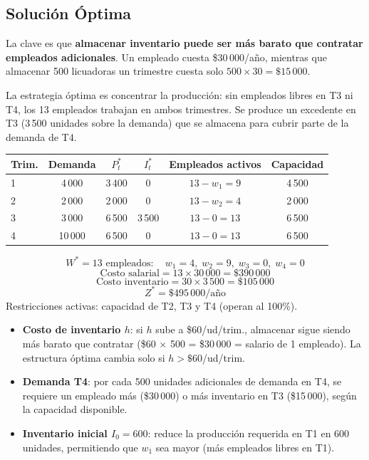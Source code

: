 \documentclass[12pt,a4paper]{article}
\begin{document}
\subsection{Solución Óptima}

La clave es que \textbf{almacenar inventario puede ser más barato que contratar
empleados adicionales}. Un empleado cuesta \$30\,000/año, mientras que almacenar
500 licuadoras un trimestre cuesta solo $500 \times 30 = \$15\,000$.

La estrategia óptima es concentrar la producción: sin empleados libres en T3 ni T4,
los 13 empleados trabajan en ambos trimestres.  Se produce un excedente en T3
(3\,500 unidades sobre la demanda) que se almacena para cubrir parte de la demanda
de T4.

\begin{center}
\renewcommand{\arraystretch}{1.3}
\begin{tabular}{@{}lccccc@{}}
\toprule
\textbf{Trim.} & \textbf{Demanda} & $P_t^*$ & $I_t^*$ &
  \textbf{Empleados activos} & \textbf{Capacidad}\\
\midrule
1 &  4\,000 & 3\,400 &     0 & $13 - w_1 = 9$  & 4\,500\\
2 &  2\,000 & 2\,000 &     0 & $13 - w_2 = 4$  & 2\,000\\
3 &  3\,000 & 6\,500 & 3\,500 & $13 - 0 = 13$   & 6\,500\\
4 & 10\,000 & 6\,500 &     0 & $13 - 0 = 13$   & 6\,500\\
\bottomrule
\end{tabular}
\end{center}

\begin{solucbox}
\[
  W^* = 13\text{ empleados}:\quad w_1=4,\;w_2=9,\;w_3=0,\;w_4=0
\]
\[
  \text{Costo salarial} = 13 \times 30\,000 = \$390\,000
\]
\[
  \text{Costo inventario} = 30 \times 3\,500 = \$105\,000
\]
\[
  \boxed{Z^* = \$495\,000/\text{año}}
\]
Restricciones activas: capacidad de T2, T3 y T4 (operan al 100\%).
\end{solucbox}

\begin{sensbox}
\begin{itemize}[leftmargin=1.5em]
  \item \textbf{Costo de inventario $h$}: si $h$ sube a \$60/ud/trim., almacenar sigue
    siendo más barato que contratar (\$60 $\times$ 500 = \$30\,000 = salario de 1 empleado).
    La estructura óptima cambia solo si $h > \$60$/ud/trim.
  \item \textbf{Demanda T4}: por cada 500 unidades adicionales de demanda en T4,
    se requiere un empleado más (\$30\,000) o más inventario en T3 (\$15\,000), según
    la capacidad disponible.
  \item \textbf{Inventario inicial $I_0 = 600$}: reduce la producción requerida en T1 en
    600 unidades, permitiendo que $w_1$ sea mayor (más empleados libres en T1).
\end{itemize}
\end{sensbox}
\end{document}
